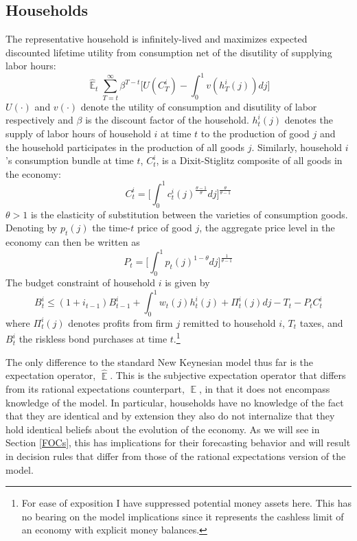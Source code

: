 \documentclass[11pt]{article}
\renewcommand{\[}{\begin{equation}}
\renewcommand{\]}{\end{equation}}
\DeclareMathOperator{\E}{\mathbb{E}}
\begin{document}
\subsection{Households}
The representative household is infinitely-lived and maximizes expected discounted lifetime utility from consumption net of the disutility of supplying labor hours:
\begin{equation}
\hat{\E}_t\sum^{\infty}_{T=t}\beta^{T-t} \bigg[ U(C^i_T) - \int_0^1 v(h^i_T(j)) dj \bigg]
\label{lifetime_U}
\end{equation}
$U(\cdot)$ and $v(\cdot)$ denote the utility of consumption and disutility of labor respectively and $\beta$ is the discount factor of the household. $h^i_t(j)$ denotes the supply of labor hours of household $i$ at time $t$ to the production of good $j$ and the household participates in the production of all goods $j$. Similarly, household $i$'s consumption bundle at time $t$,  $C_t^i$, is a Dixit-Stiglitz composite of all goods in the economy:
\begin{equation}
C^i_t =  \bigg[  \int_0^1 c^i_t(j)^{\frac{\theta-1}{\theta}} dj \bigg]^{\frac{\theta}{\theta-1}}\label{dixit}
\end{equation}
$\theta>1$ is the elasticity of substitution between the varieties of consumption goods. Denoting by $p_t(j)$ the time-$t$ price of good $j$, the aggregate price level in the economy can then be written as
\begin{equation}
P_t =  \bigg[  \int_0^1 p_t(j)^{1-\theta} dj \bigg]^{\frac{1}{\theta-1}}
\label{agg_price}
\end{equation}
The budget constraint of household $i$ is given by
\begin{equation}
 B^i_t \leq (1+i_{t-1})B^i_{t-1} + \int_0^1 w_t(j)h^i_t(j) + \Pi_t^i(j)  dj-T_t -P_tC^i_t
 \label{BC}
\end{equation}
where $\Pi_t^i(j)$ denotes profits from firm $j$ remitted to household $i$, $T_t$ taxes, and $B^i_t$ the riskless bond purchases at time $t$.\footnote{For ease of exposition I have suppressed potential money assets here. This has no bearing on the model implications since it represents the cashless limit of an economy with explicit money balances.}

The only difference to the standard New Keynesian model thus far is the expectation operator, $\hat{\E}$. This is the subjective expectation operator that differs from its rational expectations counterpart, $\E$, in that it does not encompass knowledge of the model. In particular, households have no knowledge of the fact that they are identical and by extension they also do not internalize that they hold identical beliefs about the evolution of the economy. As we will see in Section \ref{FOCs}, this has implications for their forecasting behavior and will result in decision rules that differ from those of the rational expectations version of the model.
\end{document}
